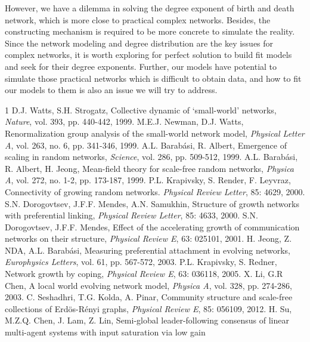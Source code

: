 \documentclass[final]{IEEEtran}
\begin{document}
However, we have a dilemma in solving the degree exponent of birth
and death network, which is more close to practical complex
networks. Besides, the constructing mechanism is required to be
more concrete to simulate the reality. Since the network modeling
and degree distribution are the key issues for complex networks,
it is worth exploring for perfect solution to build fit models and
seek for their degree exponents. Further, our models have
potential to simulate those practical networks which is difficult
to obtain data, and how to fit our models to them is also an issue
we will try to address.

\begin{thebibliography}{1}
 D.J. Watts, S.H. Strogatz, Collective dynamic of `small-world' networks, {\it Nature}, vol. 393, pp. 440-442, 1999.
 M.E.J. Newman, D.J. Watts, Renormalization group analysis of the small-world network model, {\it Physical Letter A}, vol. 263, no. 6, pp. 341-346, 1999.
 A.L. Barab\'{a}si, R. Albert, Emergence of scaling in random networks, {\it Science}, vol. 286, pp. 509-512, 1999.
 A.L. Barab\'{a}si, R. Albert, H. Jeong, Mean-field
theory for scale-free random networks, {\it Physica A}, vol. 272,
no. 1-2, pp. 173-187, 1999.
 P.L. Krapivsky, S. Render, F. Leyvraz, Connectivity
of growing random networks. {\it Physical Review Letter}, 85:
4629, 2000.
 S.N. Dorogovtsev, J.F.F. Mendes, A.N. Samukhin,
Structure of growth networks with preferential linking, {\it
Physical Review Letter}, 85: 4633, 2000.
 S.N. Dorogovtsev, J.F.F. Mendes, Effect of the accelerating growth of communication networks on their structure, {\it Physical Review E}, 63: 025101, 2001.
 H. Jeong, Z. NDA, A.L. Barab\'{a}si, Measuring preferential attachment in evolving networks, {\it Europhysics Letters}, vol. 61, pp. 567-572, 2003.
 P.L. Krapivsky, S. Redner, Network growth by coping, {\it Physical Review E}, 63: 036118, 2005.
 X. Li, G.R Chen, A local world evolving network model, {\it Physica A}, vol. 328, pp. 274-286, 2003.
 C. Seshadhri, T.G. Kolda, A. Pinar, Community structure and scale-free collections of Erd\"{o}s-R\'{e}nyi
graphs, {\it Physical Review E}, 85: 056109, 2012.
 H. Su, M.Z.Q. Chen, J. Lam, Z. Lin, Semi-global leader-following consensus of linear multi-agent systems with input saturation via low gain

\end{thebibliography}
\end{document}

